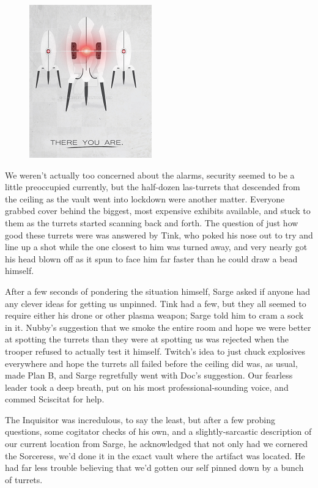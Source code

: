 \begin{figure}
	\begin{center}
		\includegraphics[width=\figwidth]{pics/18/63.png}
	\end{center}
\end{figure}
We weren't actually too concerned about the alarms, security seemed to be a little preoccupied currently, but the half-dozen las-turrets that descended from the ceiling as the vault went into lockdown were another matter. 
Everyone grabbed cover behind the biggest, most expensive exhibits available, and stuck to them as the turrets started scanning back and forth. 
The question of just how good these turrets were was answered by Tink, who poked his nose out to try and line up a shot while the one closest to him was turned away, and very nearly got his head blown off as it spun to face him far faster than he could draw a bead himself.

After a few seconds of pondering the situation himself, Sarge asked if anyone had any clever ideas for getting us unpinned. 
Tink had a few, but they all seemed to require either his drone or other plasma weapon; 
Sarge told him to cram a sock in it. 
Nubby's suggestion that we smoke the entire room and hope we were better at spotting the turrets than they were at spotting us was rejected when the trooper refused to actually test it himself. 
Twitch's idea to just chuck explosives everywhere and hope the turrets all failed before the ceiling did was, as usual, made Plan B, and Sarge regretfully went with Doc's suggestion. 
Our fearless leader took a deep breath, put on his most professional-sounding voice, and commed Sciscitat for help.

The Inquisitor was incredulous, to say the least, but after a few probing questions, some cogitator checks of his own, and a slightly-sarcastic description of our current location from Sarge, he acknowledged that not only had we cornered the Sorceress, we'd done it in the exact vault where the artifact was located. 
He had far less trouble believing that we'd gotten our self pinned down by a bunch of turrets. 


